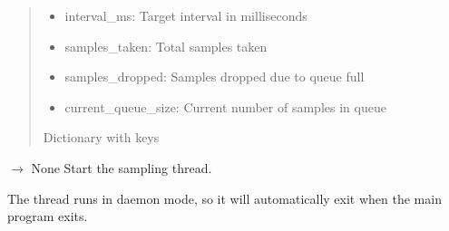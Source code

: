 \documentclass[letterpaper,10pt,english]{sphinxmanual}
\begin{document}
\begin{fulllineitems}
\begin{fulllineitems}
\begin{quote}
\begin{description}
\begin{itemize}
\item {} 
\sphinxAtStartPar
interval\_ms: Target interval in milliseconds

\item {} 
\sphinxAtStartPar
samples\_taken: Total samples taken

\item {} 
\sphinxAtStartPar
samples\_dropped: Samples dropped due to queue full

\item {} 
\sphinxAtStartPar
current\_queue\_size: Current number of samples in queue

\end{itemize}


\sphinxAtStartPar
Dictionary with keys

\end{description}\end{quote}

\end{fulllineitems}


\begin{fulllineitems}
\label{\detokenize{core.utils.sampling:core.utils.sampling.HighFrequencySampler.start}}
\pysigstartsignatures
\pysiglinewithargsret
{}
{}
{{ $\rightarrow$ None}}
\pysigstopsignatures
\sphinxAtStartPar
Start the sampling thread.

\sphinxAtStartPar
The thread runs in daemon mode, so it will automatically exit when the
main program exits.

\end{fulllineitems}


\begin{fulllineitems}
\label{\detokenize{core.utils.sampling:core.utils.sampling.HighFrequencySampler.start_time}}
\pysigstartsignatures
\pysigline
{}
\pysigstopsignatures
\end{fulllineitems}



\end{fulllineitems}
\end{document}
